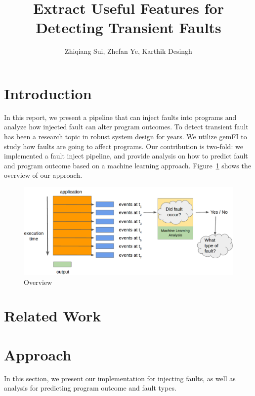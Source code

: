 \documentclass{sig-alternate}
\title{Extract Useful Features for Detecting Transient Faults}
\author{Zhiqiang Sui, Zhefan Ye, Karthik Desingh}
\begin{document}
\maketitle
\thispagestyle{firstpage}
\pagestyle{plain}

\begin{abstract}

\end{abstract}

\section{Introduction}
In this report, we present a pipeline that can inject faults into programs and analyze how injected fault can alter program outcomes. To detect transient fault has been a research topic in robust system design for years. We utilize gemFI to study how faults are going to affect programs. Our contribution is two-fold: we implemented a fault inject pipeline, and provide analysis on how to predict fault and program outcome based on a machine learning approach. Figure~\ref{fig:teaser} shows the overview of our approach.

\begin{figure}[t]
\begin{center}
   \includegraphics[width=0.95\linewidth]{./figures/teaser.png}
\end{center}
   \caption{Overview}
\label{fig:teaser}
\end{figure}

\section{Related Work}

\section{Approach}
In this section, we present our implementation for injecting faults, as well as analysis for predicting program outcome and fault types.
\end{document}
